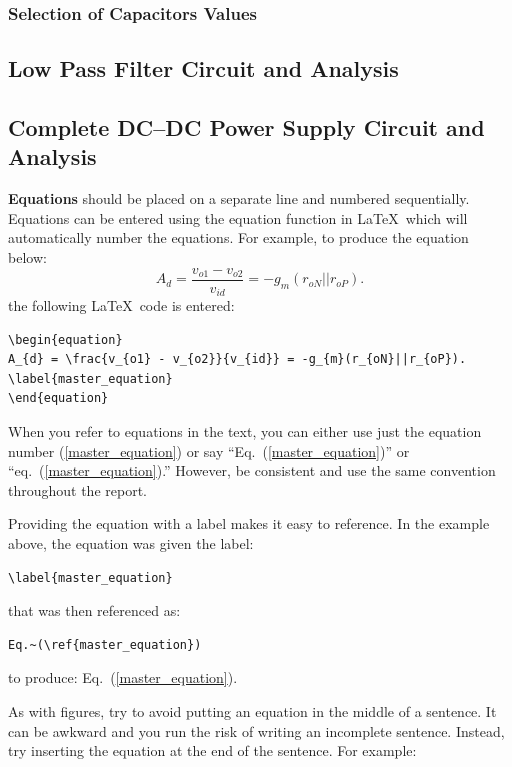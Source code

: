 \documentclass[11pt]{article}
\begin{document}
\subsubsection{Selection of Capacitors Values}

\subsection{Low Pass Filter Circuit and Analysis}

\subsection{Complete DC--DC Power Supply Circuit and Analysis}


\textbf{Equations} should be placed on a separate line and numbered sequentially. Equations can be entered using the equation function in \LaTeX\ which will automatically number the equations. For example, to produce the equation below:  
\begin{equation}
A_{d} = \frac{v_{o1} - v_{o2}}{v_{id}} = -g_{m}(r_{oN}||r_{oP}).
\label{master_equation}
\end{equation}
the following \LaTeX\ code is entered: 
\begin{verbatim}
\begin{equation}
A_{d} = \frac{v_{o1} - v_{o2}}{v_{id}} = -g_{m}(r_{oN}||r_{oP}).
\label{master_equation}
\end{equation}
\end{verbatim}


When you refer to equations in the text, you can either use just the equation number (\ref{master_equation}) or say ``Eq.~(\ref{master_equation})'' or ``eq.~(\ref{master_equation}).'' However, be consistent and use the same convention throughout the report. 

Providing the equation with a label makes it easy to reference. In the example above, the equation was given the label: \begin{verbatim}\label{master_equation}\end{verbatim} that was then referenced as:
\begin{verbatim}
Eq.~(\ref{master_equation})
\end{verbatim}
to produce: Eq.~(\ref{master_equation}).

As with figures, try to avoid putting an equation in the middle of a sentence. It can be awkward and you run the risk of writing an incomplete sentence. Instead, try inserting the equation at the end of the sentence. For example:
\end{document}
